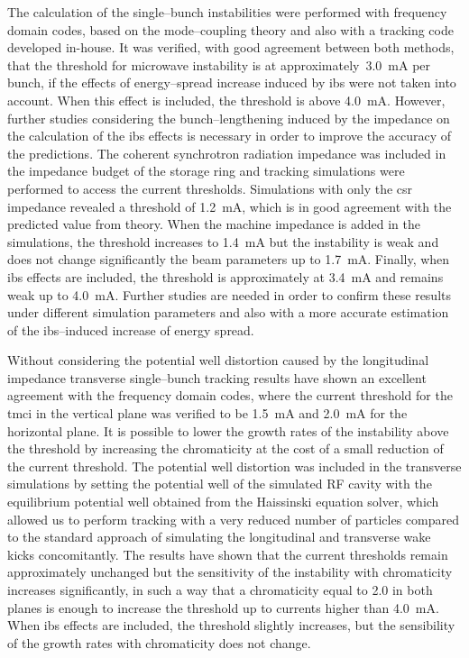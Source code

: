     The calculation of the single--bunch instabilities were performed with frequency domain codes, based on the mode--coupling theory and also with a tracking code developed in-house. It was verified, with good agreement between both methods, that the threshold for microwave instability is at approximately~\SI{3.0}{\milli\ampere} per bunch, if the effects of energy--spread increase induced by \gls{ibs} were not taken into account. When this effect is included, the threshold is above \SI{4.0}{\milli\ampere}. However, further studies considering the bunch--lengthening induced by the impedance on the calculation of the \gls{ibs} effects is necessary in order to improve the accuracy of the predictions. The coherent synchrotron radiation impedance was included in the impedance budget of the storage ring and tracking simulations were performed to access the current thresholds. Simulations with only the \gls{csr} impedance revealed a threshold of \SI{1.2}{\milli\ampere}, which is in good agreement with the predicted value from theory. When the machine impedance is added in the simulations, the threshold increases to \SI{1.4}{\milli\ampere} but the instability is weak and does not change significantly the beam parameters up to \SI{1.7}{\milli\ampere}.
    Finally, when \gls{ibs} effects are included, the threshold is approximately at \SI{3.4}{\milli\ampere} and remains weak up to \SI{4.0}{\milli\ampere}. Further studies are needed in order to confirm these results under different simulation parameters and also with a more accurate estimation of the \gls{ibs}--induced increase of energy spread.

    Without considering the potential well distortion caused by the longitudinal impedance transverse single--bunch tracking results have shown an excellent agreement with the frequency domain codes, where the current threshold for the \gls{tmci} in the vertical plane was verified to be \SI{1.5}{\milli\ampere} and \SI{2.0}{\milli\ampere} for the horizontal plane. It is possible to lower the growth rates of the instability above the threshold by increasing the chromaticity at the cost of a small reduction of the current threshold. The potential well distortion was included in the transverse simulations by setting the potential well of the simulated RF cavity with the equilibrium potential well obtained from the Haissinski equation solver, which allowed us to perform tracking with a very reduced number of particles compared to the standard approach of simulating the longitudinal and transverse wake kicks concomitantly. The results have shown that the current thresholds remain approximately unchanged but the sensitivity of the instability with chromaticity increases significantly, in such a way that a chromaticity equal to \num{2.0} in both planes is enough to increase the threshold up to currents higher than \SI{4.0}{\milli\ampere}. When \gls{ibs} effects are included, the threshold slightly increases, but the sensibility of the growth rates with chromaticity does not change.

